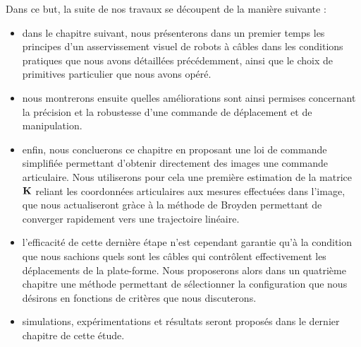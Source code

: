 Dans ce but, la suite de nos travaux se d\'ecoupent de la mani\`ere 
suivante :
\begin{itemize}
 \item dans le chapitre suivant, nous pr\'esenterons dans un premier temps les 
principes d'un asservissement visuel de robots \`a c\^ables dans les conditions 
pratiques que nous avons d\'etaill\'ees pr\'ec\'edemment, ainsi que le choix 
de primitives particulier que nous avons op\'er\'e.
\item nous montrerons ensuite quelles am\'eliorations sont ainsi permises 
concernant la pr\'ecision et la robustesse d'une commande de d\'eplacement et de 
manipulation.
\item enfin, nous concluerons ce chapitre en proposant une loi de commande 
simplifi\'ee permettant d'obtenir directement des images une commande 
articulaire. Nous utiliserons pour cela une premi\`ere estimation de la matrice 
$\bf K$ reliant les coordonn\'ees articulaires aux mesures effectu\'ees dans 
l'image, que nous actualiseront gr\`ace \`a la m\'ethode de Broyden permettant 
de converger rapidement vers une trajectoire lin\'eaire.
\item l'efficacit\'e de cette derni\`ere \'etape n'est cependant garantie 
qu'\`a la condition que nous sachions quels sont les c\^ables qui contr\^olent 
effectivement les d\'eplacements de la plate-forme. Nous proposerons alors dans 
un quatri\`eme chapitre une m\'ethode permettant de s\'electionner la 
configuration que nous d\'esirons en fonctions de crit\`eres que nous 
discuterons.
\item simulations, exp\'erimentations et r\'esultats seront propos\'es dans le 
dernier chapitre de cette \'etude.
\end{itemize}

